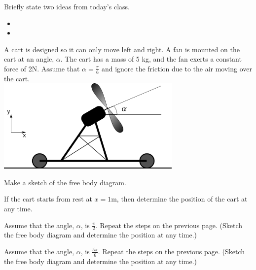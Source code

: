\postClass

\begin{problem}
\item Briefly state two ideas from today's class.
  \begin{itemize}
  \item 
  \item 
  \end{itemize}
\item 
  \begin{subproblem}
    \item
  \end{subproblem}
\end{problem}



\begin{problem}
\item
\end{problem}


\begin{problem}
\item A cart is designed so it can only move left and right. A fan is
  mounted on the cart at an angle, $\alpha$. The cart has a mass of 5
  kg, and the fan exerts a constant force of 2N. Assume that
  $\alpha=\frac{\pi}{6}$ and ignore the friction due to the air moving
  over the cart.  \\
  \includegraphics[width=9cm]{ink/week6/airCart}
  \begin{subproblem}
    \item Make a sketch of the free body diagram.
      \vspace{10em}
    \item If the cart starts from rest at $x=1$m, then determine the
      position of the cart at any time.
      \vfill
      \clearpage
    \item Assume that the angle, $\alpha$, is $\frac{\pi}{2}$. Repeat
      the steps on the previous page. (Sketch the free body diagram
      and determine the position at any time.)
      \vfill
      \clearpage
    \item Assume that the angle, $\alpha$, is $\frac{5\pi}{6}$. Repeat
      the steps on the previous page. (Sketch the free body diagram
      and determine the position at any time.)
      \vfill
  \end{subproblem}
\end{problem}

